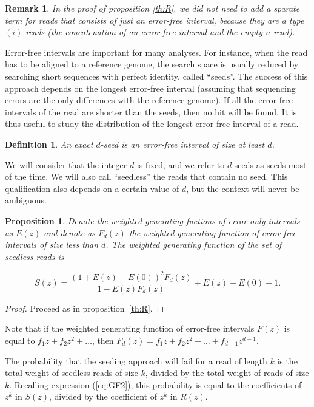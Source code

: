 \documentclass{article}
\newtheorem{definition}{Definition}
\newtheorem{proposition}{Proposition}
\newtheorem{remark}{Remark}
\begin{document}
\begin{remark}
In the proof of proposition \ref{th:R}, we did not need to add a sparate
term for reads that consists of just an error-free interval, because they
are a type $(i)$ reads (the concatenation of an error-free interval and
the empty $u$-read).
\end{remark}

Error-free intervals are important for many analyses. For instance, when
the read has to be aligned to a reference genome, the search space is
usually reduced by searching short sequences with perfect identity, called
``seeds''. The success of this approach depends on the longest error-free
interval (assuming that sequencing errors are the only differences with
the reference genome). If all the error-free intervals of the read are
shorter than the seeds, then no hit will be found. It is thus useful to
study the distribution of the longest error-free interval of a read.

\begin{definition}
\label{def:seed}
An exact $d$-seed is an error-free interval of size at least $d$.
\end{definition}

We will consider that the integer $d$ is fixed, and we refer to $d$-seeds
as seeds most of the time. We will also call ``seedless'' the reads that
contain no seed. This qualification also depends on a certain value of
$d$, but the context will never be ambiguous.

\begin{proposition}
\label{th:S}
Denote the weighted generating fuctions of error-only intervals as $E(z)$
and denote as $F_d(z)$ the weighted generating function of error-free
intervals of size less than $d$. The weighted generating function of the
set of seedless reads is

\begin{equation}
\label{eq:S}
S(z) = \frac{(1+E(z)-E(0))^2F_d(z)}{1-E(z)F_d(z)} + E(z)-E(0)+1.
\end{equation}
\end{proposition}

\begin{proof}
Proceed as in proposition~\ref{th:R}.
\end{proof}

Note that if the weighted generating function of error-free intervals
$F(z)$ is equal to $f_1z + f_2z^2 + \ldots$, then $F_d(z) = f_1z + f_2z^2
+ \ldots + f_{d-1}z^{d-1}$.

The probability that the seeding approach will fail for a read of length
$k$ is the total weight of seedless reads of size $k$, divided by the
total weight of reads of size $k$. Recalling expression (\ref{eq:GF2}),
this probability is equal to the coefficients of $z^k$ in $S(z)$, divided
by the coefficient of $z^k$ in $R(z)$.
\end{document}
